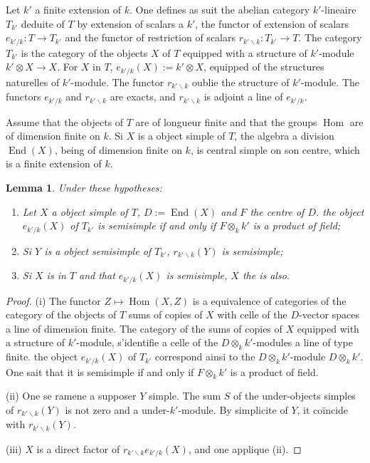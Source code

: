 \documentclass[11pt,a4paper]{article}
\theoremstyle{plain}
\newtheorem{lemma}[theorem]{Lemma}
\theoremstyle{definition}
\DeclareMathOperator{\Hom}{Hom}
\DeclareMathOperator{\End}{End}
\begin{document}
Let $k'$ a finite extension of $k$. One defines as suit the abelian category $k'$-lineaire $T_{k'}$ deduite of $T$ by extension of scalars a $k'$, the functor of extension of scalars $e_{k'/k}: T \to T_{k'}$ and the functor of restriction of scalars $r_{k' \backslash k}: T_{k'} \to T$. The category $T_{k'}$ is the category of the objects $X$ of $T$ equipped with a structure of $k'$-module $k' \otimes X \to X$. For $X$ in $T$, $e_{k'/k}(X) := k' \otimes X$, equipped of the structures naturelles of $k'$-module. The functor $r_{k' \backslash k}$ oublie the structure of $k'$-module. The functors $e_{k'/k}$ and $r_{k' \backslash k}$ are exacts, and $r_{k' \backslash k}$ is adjoint a line of $e_{k'/k}$.

Assume that the objects of $T$ are of longueur finite and that the groups $\Hom$ are of dimension finite on $k$. Si $X$ is a object simple of $T$, the algebra a division $\End(X)$, being of dimension finite on $k$, is central simple on son centre, which is a finite extension of $k$.

\begin{lemma}\label{lem:4.2}
Under these hypotheses:
\begin{enumerate}[label=(\roman*)]
\item Let $X$ a object simple of $T$, $D := \End(X)$ and $F$ the centre of $D$. the object $e_{k'/k}(X)$ of $T_{k'}$ is semisimple if and only if $F \otimes_k k'$ is a product of field;
\item Si $Y$ is a object semisimple of $T_{k'}$, $r_{k' \backslash k}(Y)$ is semisimple;
\item Si $X$ is in $T$ and that $e_{k'/k}(X)$ is semisimple, $X$ the is also.
\end{enumerate}
\end{lemma}

\begin{proof}
(i) The functor $Z \mapsto \Hom(X, Z)$ is a equivalence of categories of the category of the objects of $T$ sums of copies of $X$ with celle of the $D$-vector spaces a line of dimension finite. The category of the sums of copies of $X$ equipped with a structure of $k'$-module, s'identifie a celle of the $D \otimes_k k'$-modules a line of type finite. the object $e_{k'/k}(X)$ of $T_{k'}$ correspond ainsi to the $D \otimes_k k'$-module $D \otimes_k k'$. One sait that it is semisimple if and only if $F \otimes_k k'$ is a product of field.

(ii) One se ramene a supposer $Y$ simple. The sum $S$ of the under-objects simples of $r_{k' \backslash k}(Y)$ is not zero and a under-$k'$-module. By simplicite of $Y$, it co\"incide with $r_{k' \backslash k}(Y)$.

(iii) $X$ is a direct factor of $r_{k' \backslash k} e_{k'/k}(X)$, and one applique (ii).
\end{proof}
\end{document}
